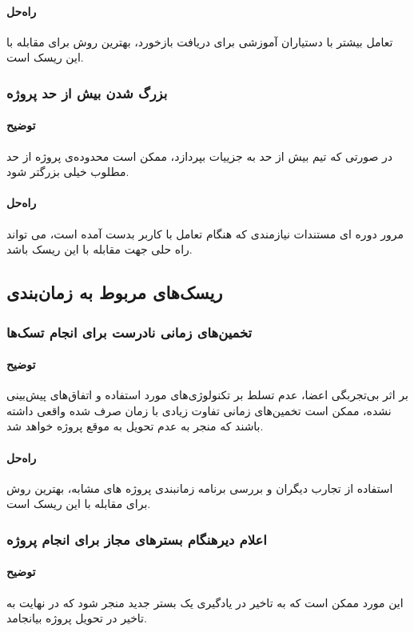 \paragraph{راه‌حل}
تعامل بیشتر با دستیاران آموزشی برای دریافت بازخورد، بهترین روش برای مقابله با این ریسک است.
\subsubsection{بزرگ شدن بیش از حد پروژه}
\paragraph{توضیح}
در صورتی که تیم بیش از حد به جزییات بپردازد، ممکن است محدوده‌ی پروژه از حد مطلوب خیلی بزرگتر شود.
\paragraph{راه‌حل}
مرور دوره ای مستندات نیازمندی که هنگام تعامل با کاربر بدست آمده است، می تواند راه حلی جهت مقابله با این ریسک باشد.
\subsection{ریسک‌های مربوط به زمان‌بندی}
\subsubsection{تخمین‌های زمانی نادرست برای انجام تسک‌ها}
\paragraph{توضیح}
بر اثر بی‌تجربگی اعضا، عدم تسلط بر تکنولوژی‌های مورد استفاده و اتفاق‌های پیش‌بینی نشده، ممکن است تخمین‌های زمانی تفاوت زیادی با زمان صرف شده واقعی داشته باشند که منجر به عدم تحویل به موقع پروژه خواهد شد.
\paragraph{راه‌حل}
استفاده از تجارب دیگران و بررسی برنامه زمانبندی پروژه های مشابه، بهترین روش برای مقابله با این ریسک است.
\subsubsection{اعلام دیرهنگام بسترهای مجاز برای انجام پروژه}
\paragraph{توضیح}
این مورد ممکن است که به تاخیر در یادگیری یک بستر جدید منجر شود که در نهایت به تاخیر در تحویل پروژه بیانجامد.

